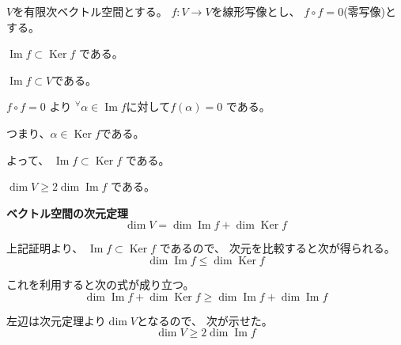 \documentclass[12pt,b5paper]{ltjsarticle}
\newcommand{\Img}{\mathop{\mathrm{Im}}\nolimits}
\newcommand{\Ker}{\mathop{\mathrm{Ker}}\nolimits}
\begin{document}
\hrulefill

$V$を有限次ベクトル空間とする。
$f:V\to V$を線形写像とし、
$f\circ f =0$(零写像)とする。

\hrulefill

$\Img{f} \subset \Ker{f}$
である。

\dotfill

$\Img{f} \subset V$である。

$f\circ f =0$ より
${}^{\forall} \alpha \in \Img{f}$に対して$f(\alpha)=0$
である。

つまり、$\alpha \in \Ker{f}$である。

よって、
$\Img{f} \subset \Ker{f}$
である。

\hrulefill

$\dim{V} \geq 2 \dim{\Img{f}}$
である。

\dotfill

\textbf{ベクトル空間の次元定理}
\begin{equation}
 \dim{V}
  = \dim{\Img{f}} + \dim{\Ker{f}}
\end{equation}

上記証明より、
$\Img{f} \subset \Ker{f}$
であるので、
次元を比較すると次が得られる。
\begin{equation}
 \dim{\Img{f}} \leq  \dim{\Ker{f}}
\end{equation}

これを利用すると次の式が成り立つ。
\begin{equation}
  \dim{\Img{f}} + \dim{\Ker{f}}
  \geq \dim{\Img{f}} + \dim{\Img{f}}
\end{equation}

左辺は次元定理より$\dim{V}$となるので、
次が示せた。
\begin{equation}
 \dim{V} \geq 2 \dim{\Img{f}}
\end{equation}


\hrulefill
\end{document}

